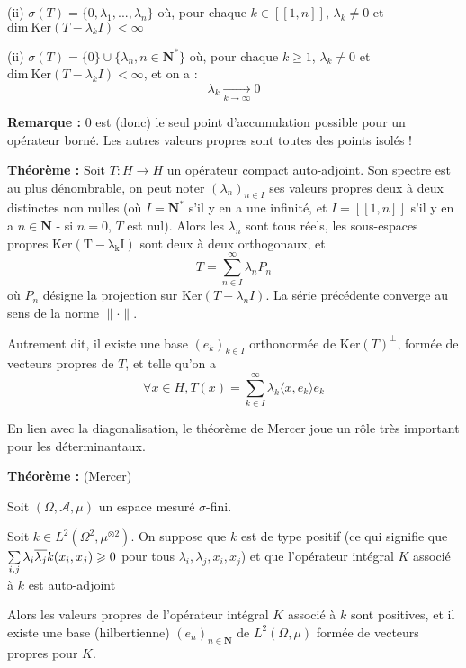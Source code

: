 \documentclass[12pt]{article}
\let\oldsum\sum
\renewcommand{\sum}{\oldsum\limits}
\begin{document}
(ii) $ \sigma(T) = \{ 0, \lambda_1, ..., \lambda _n \} $ où, pour chaque $ k \in [\![1,n]\!] $, $ \lambda_k \neq 0$ et $ \mathrm{dim} \:  \mathrm{Ker}(T - \lambda_k I) < \infty $

(ii) $ \sigma(T) = \{ 0 \} \cup \{ \lambda_n, n \in \mathbf N^* \} $ où, pour chaque $ k \geqslant 1 $, $ \lambda_k \neq 0$ et $ \mathrm{dim} \: \mathrm{Ker}(T - \lambda_k I) < \infty $, et on a : $$\lambda_k \xrightarrow[k \to \infty]{} 0 $$

\textbf{Remarque :} $0$ est (donc) le seul point d'accumulation possible pour un opérateur borné. Les autres valeurs propres sont toutes des points isolés !

\textbf{Théorème :} Soit $T : H \to H$ un opérateur compact auto-adjoint. Son spectre est au plus dénombrable, on peut noter $ (\lambda_n)_{n \in I} $ ses valeurs propres deux à deux distinctes non nulles (où $ I = \mathbf N^* $ s'il y en a une infinité, et $ I = [\![1,n]\!] $ s'il y en a $ n \in \mathbf N $ - si $n = 0$, $T$ est nul). 
Alors les $ \lambda_n $ sont tous réels, les sous-espaces propres $ \mathrm{Ker(T - \lambda_k I)} $ sont deux à deux orthogonaux, et $$ T = \sum_{n \in I}^\infty \lambda_n P_n $$  où $ P_n $ désigne la projection sur $ \mathrm{Ker}(T-\lambda_n I) $. La série précédente converge au sens de la norme $ \| \cdot \|$.

Autrement dit, il existe une base $(e_k)_{k \in I}$ orthonormée de $ \mathrm{Ker}(T)^\perp $,  formée de vecteurs propres de $T$, et telle qu'on a $$ \forall x \in H, T(x) = \sum_{k \in I }^\infty \lambda_k \langle x, e_k \rangle e_k $$



En lien avec la diagonalisation, le théorème de Mercer joue un rôle très important pour les déterminantaux.

\textbf{Théorème :} (Mercer)

Soit $(\Omega, \mathcal A, \mu) $ un espace mesuré $ \sigma$-fini.

Soit $ k \in L^2(\Omega^2, \mu^{\otimes 2}) $. On suppose que $k$ est de type positif (ce qui signifie que $ \sum\limits_{i,j} \lambda_i \overline{\lambda_j} k(x_i,x_j) \geqslant 0 $ pour tous $ \lambda_i, \lambda_j, x_i, x_j $) et que l'opérateur intégral $K$ associé à $k$ est auto-adjoint

Alors les valeurs propres de l'opérateur intégral $K$ associé à $k$ sont positives, et il existe une base (hilbertienne) $(e_n)_{n\in\mathbf N}$ de $L^2(\Omega, \mu)$ formée de vecteurs propres pour $K$. 
\end{document}

